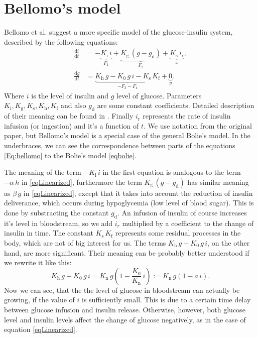 \documentclass{article}
\providecommand{\m}[1]{\ensuremath{\mathrm{#1}}}
\begin{document}
\section{Bellomo's model}
Bellomo et al. \cite{bellomo} suggest a more specific model of the glucose-insulin system, described by the following equations:
\begin{equation}
\label{Eq:bellomo}
\begin{aligned}
 \frac{\m{d}i}{\m{d}t} &= -\underbrace{K_{\mathrm{i}}\,i}_{F_1} + \underbrace{K_{\mathrm{g}}\,(g - g_{\mathrm{d}})}_{F_2} + \underbrace{K_{\mathrm{s}}\,i_{\mathrm{r}}}_{x}, \\
 \frac{\m{d}g}{\m{d}t} &= \underbrace{K_{\mathrm{h}}\,g - K_0\,g\,i - K_{\mathrm{s}}\,K_{\mathrm{f}}}_{-F_3-F_4} + \underbrace{0}_{y}.
\end{aligned}
\end{equation}
Where $i$ is the level of insulin and $g$ level of glucose.
Parameters $K_{\mathrm{i}}, K_{\mathrm{g}}, K_{\mathrm{s}}, K_{\mathrm{h}}, K_{\mathrm{f}}$ and also $g_{\mathrm{d}}$ are some constant coefficients.
Detailed description of their meaning can be found in \cite{bellomo}.
Finally $i_{\mathrm{r}}$ represents the rate of insulin infusion (or ingestion) and it's a function of $t$.
We use notation from the original paper, but Bellomo's model is a special case of the general Bolie's model.
In the underbraces, we can see the correspondence between parts of the equations \eqref{Eq:bellomo} to the Bolie's model \eqref{eqbolie}.

The meaning of the term $-K_{\mathrm{i}}\,i$ in the first equation is analogous to the term $-\alpha\,h$ in \eqref{eqLinearized},
furthermore the term $K_{\mathrm{g}}\,(g - g_{\mathrm{d}})$ has similar meaning as $\beta\,g$ in \eqref{eqLinearized},
except that it takes into account the reduction of insulin deliverance, which occurs during hypoglycemia 
(low level of blood sugar). This is done by substracting the constant $g_{\mathrm{d}}$.
An infusion of insulin of course increases it's level in bloodstream, so we add $i_r$ multiplied by a coefficient
to the change of insulin in time. The constant $K_{\mathrm{s}}\,K_{\mathrm{f}}$ represents some residual processes in the body,
which are not of big interest for us. The terms $K_{\mathrm{h}}\,g - K_0\,g\,i$, on the other hand,
are more significant. Their meaning can be probably better understood if we rewrite it like this:
\[ K_{\mathrm{h}}\,g - K_0\,g\,i = K_{\mathrm{n}}\,g\left(1 - \frac{K_0}{K_{\mathrm{n}}}\,i\right) := K_{\mathrm{n}}\,g(1 - a\,i). \]
Now we can see, that the the level of glucose in bloodstream can actually be growing, if
the value of $i$ is sufficiently small.
This is due to a certain time delay between glucose infusion and insulin release.
Otherwise, however, both glucose level and insulin levels affect the change of glucose negatively,
as in the case of equation \eqref{eqLinearized}.
\end{document}

